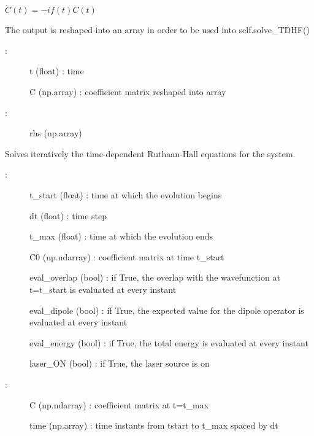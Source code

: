 \documentclass[letterpaper,10pt,english]{sphinxmanual}
\begin{document}
\begin{fulllineitems}
\begin{fulllineitems}
\(\dot{C}(t) = -i f(t)C(t)\)

The output is reshaped into an array in order to be used into self.solve\_TDHF()
\begin{description}
\item[{:}] \leavevmode
t (float) : time

C (np.array) : coefficient matrix reshaped into array

\item[{:}] \leavevmode
rhs (np.array)

\end{description}

\end{fulllineitems}


\begin{fulllineitems}
\label{\detokenize{index:do.GHF.solve_TDHF}}
Solves iteratively the time-dependent Ruthaan-Hall equations for the system.
\begin{description}
\item[{:}] \leavevmode
t\_start (float) : time at which the evolution begins

dt (float) : time step

t\_max (float) : time at which the evolution ends

C0 (np.ndarray) : coefficient matrix at time t\_start

eval\_overlap (bool) : if True, the overlap with the wavefunction at t=t\_start is evaluated at every instant

eval\_dipole (bool) : if True, the expected value for the dipole operator is evaluated at every instant

eval\_energy (bool) : if True, the total energy is evaluated at every instant

laser\_ON (bool) : if True, the laser source is on

\item[{: }] \leavevmode
C (np.ndarray) : coefficient matrix at t=t\_max

time (np.array) : time instants from tstart to t\_max spaced by dt


\end{description}
\end{fulllineitems}
\end{fulllineitems}
\end{document}
